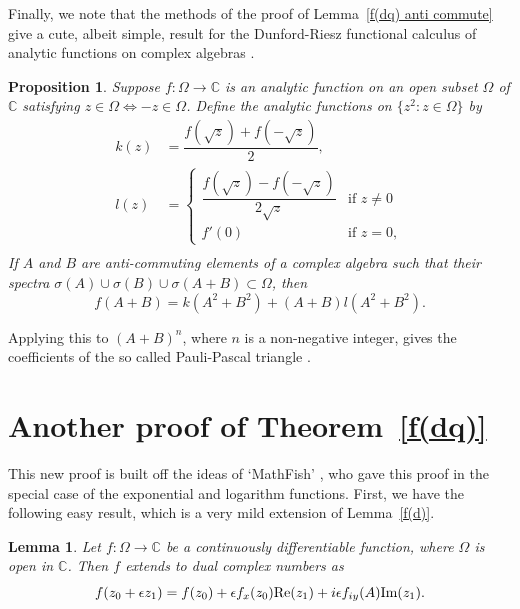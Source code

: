 \documentclass[12pt,reqno]{amsart}
\newtheorem{lemma}[theorem]{Lemma}
\newtheorem{prop}[theorem]{Proposition}
\begin{document}
\bigskip

Finally, we note that the methods of the proof of Lemma~\ref{f(dq) anti commute} give a cute, albeit simple, result for the Dunford-Riesz functional calculus of analytic functions on complex algebras \cite{dunford-et-al}.

\begin{prop}
\label{analytic}
Suppose $f:\Omega \to \mathbb C$ is an analytic function on an open subset $\Omega$ of $\mathbb C$ satisfying $z \in \Omega \Leftrightarrow -z \in \Omega$.  Define the analytic functions on $\{z^2 : z \in \Omega\}$ by
\begin{align}
\label{g a}
k(z) &= \dfrac{f(\sqrt z) + f(-\sqrt z)}{2} ,\\
\label{h a}
l(z) &= \begin{cases}
\dfrac{f(\sqrt z) - f(-\sqrt z)}{2\sqrt z} &\text{if $z \ne 0$} \\
f'(0) &\text{if $z = 0$} ,
\end{cases} \\
\end{align}
If $A$ and $B$ are anti-commuting elements of a complex algebra such that their spectra $\sigma(A) \cup \sigma(B) \cup \sigma(A+B) \subset \Omega$, then
\begin{equation}
f(A+B) = k(A^2+B^2) + (A+B) l(A^2+B^2) .
\end{equation}
\end{prop}

Applying this to $(A+B)^n$, where $n$ is a non-negative integer, gives the coefficients of the so called Pauli-Pascal triangle \cite{horn,sloane}.

\section*{Another proof of Theorem~\ref{f(dq)}}

This new proof is built off the ideas of `MathFish' \cite{math-fish}, who gave this proof in the special case of the exponential and logarithm functions.  First, we have the following easy result, which is a very mild extension of Lemma~\ref{f(d)}.

\begin{lemma}
\label{f(dc)}
Let $f:\Omega \to \mathbb C$ be a continuously differentiable function, where $\Omega$ is open in $\mathbb C$.  Then $f$ extends to dual complex numbers as
\begin{equation}
f(z_0 + \epsilon z_1 ) = f(z_0) + \epsilon f_x(z_0) \text{\rm Re}(z_1)
+ i \epsilon f_{iy}(A) \text{\rm Im}(z_1) .
\end{equation}
\end{lemma}
\end{document}
